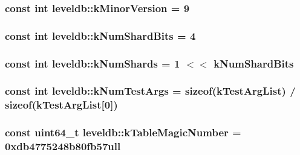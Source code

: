 \subsubsection[{k\+Minor\+Version}]{\setlength{\rightskip}{0pt plus 5cm}const int leveldb\+::k\+Minor\+Version = 9\hspace{0.3cm}{\ttfamily [static]}}\label{namespaceleveldb_afba0124470c60dd33b9d82838f40fc04}
\hypertarget{namespaceleveldb_ac3f66d6fb2271c29359e1cd233b1f8ca}{}
\subsubsection[{k\+Num\+Shard\+Bits}]{\setlength{\rightskip}{0pt plus 5cm}const int leveldb\+::k\+Num\+Shard\+Bits = 4\hspace{0.3cm}{\ttfamily [static]}}\label{namespaceleveldb_ac3f66d6fb2271c29359e1cd233b1f8ca}
\hypertarget{namespaceleveldb_aba1a810d4663b150df2768b04205f5ed}{}
\subsubsection[{k\+Num\+Shards}]{\setlength{\rightskip}{0pt plus 5cm}const int leveldb\+::k\+Num\+Shards = 1 $<$$<$ {\bf k\+Num\+Shard\+Bits}\hspace{0.3cm}{\ttfamily [static]}}\label{namespaceleveldb_aba1a810d4663b150df2768b04205f5ed}
\hypertarget{namespaceleveldb_a0bc857a7e9baff42f61503688957b6f5}{}
\subsubsection[{k\+Num\+Test\+Args}]{\setlength{\rightskip}{0pt plus 5cm}const int leveldb\+::k\+Num\+Test\+Args = sizeof({\bf k\+Test\+Arg\+List}) / sizeof({\bf k\+Test\+Arg\+List}\mbox{[}0\mbox{]})\hspace{0.3cm}{\ttfamily [static]}}\label{namespaceleveldb_a0bc857a7e9baff42f61503688957b6f5}
\hypertarget{namespaceleveldb_a4ea4fa6917989c12324b715f1b3069f8}{}
\subsubsection[{k\+Table\+Magic\+Number}]{\setlength{\rightskip}{0pt plus 5cm}const {\bf uint64\+\_\+t} leveldb\+::k\+Table\+Magic\+Number = 0xdb4775248b80fb57ull\hspace{0.3cm}{\ttfamily [static]}}\label{namespaceleveldb_a4ea4fa6917989c12324b715f1b3069f8}
\hypertarget{namespaceleveldb_a6d7e1fb11fbc0e83ef27e87007c8a425}{}
